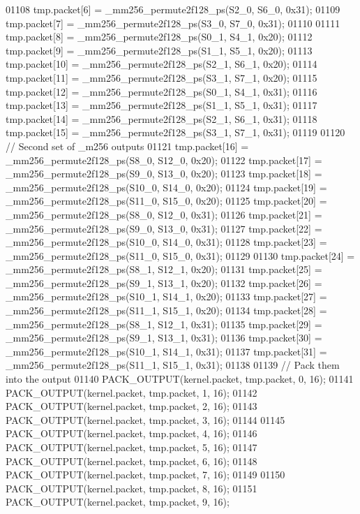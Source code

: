 \begin{DoxyCode}
01108   tmp.packet[6] = \_mm256\_permute2f128\_ps(S2\_0, S6\_0, 0x31);
01109   tmp.packet[7] = \_mm256\_permute2f128\_ps(S3\_0, S7\_0, 0x31);
01110 
01111   tmp.packet[8] = \_mm256\_permute2f128\_ps(S0\_1, S4\_1, 0x20);
01112   tmp.packet[9] = \_mm256\_permute2f128\_ps(S1\_1, S5\_1, 0x20);
01113   tmp.packet[10] = \_mm256\_permute2f128\_ps(S2\_1, S6\_1, 0x20);
01114   tmp.packet[11] = \_mm256\_permute2f128\_ps(S3\_1, S7\_1, 0x20);
01115   tmp.packet[12] = \_mm256\_permute2f128\_ps(S0\_1, S4\_1, 0x31);
01116   tmp.packet[13] = \_mm256\_permute2f128\_ps(S1\_1, S5\_1, 0x31);
01117   tmp.packet[14] = \_mm256\_permute2f128\_ps(S2\_1, S6\_1, 0x31);
01118   tmp.packet[15] = \_mm256\_permute2f128\_ps(S3\_1, S7\_1, 0x31);
01119 
01120   \textcolor{comment}{// Second set of \_m256 outputs}
01121   tmp.packet[16] = \_mm256\_permute2f128\_ps(S8\_0, S12\_0, 0x20);
01122   tmp.packet[17] = \_mm256\_permute2f128\_ps(S9\_0, S13\_0, 0x20);
01123   tmp.packet[18] = \_mm256\_permute2f128\_ps(S10\_0, S14\_0, 0x20);
01124   tmp.packet[19] = \_mm256\_permute2f128\_ps(S11\_0, S15\_0, 0x20);
01125   tmp.packet[20] = \_mm256\_permute2f128\_ps(S8\_0, S12\_0, 0x31);
01126   tmp.packet[21] = \_mm256\_permute2f128\_ps(S9\_0, S13\_0, 0x31);
01127   tmp.packet[22] = \_mm256\_permute2f128\_ps(S10\_0, S14\_0, 0x31);
01128   tmp.packet[23] = \_mm256\_permute2f128\_ps(S11\_0, S15\_0, 0x31);
01129 
01130   tmp.packet[24] = \_mm256\_permute2f128\_ps(S8\_1, S12\_1, 0x20);
01131   tmp.packet[25] = \_mm256\_permute2f128\_ps(S9\_1, S13\_1, 0x20);
01132   tmp.packet[26] = \_mm256\_permute2f128\_ps(S10\_1, S14\_1, 0x20);
01133   tmp.packet[27] = \_mm256\_permute2f128\_ps(S11\_1, S15\_1, 0x20);
01134   tmp.packet[28] = \_mm256\_permute2f128\_ps(S8\_1, S12\_1, 0x31);
01135   tmp.packet[29] = \_mm256\_permute2f128\_ps(S9\_1, S13\_1, 0x31);
01136   tmp.packet[30] = \_mm256\_permute2f128\_ps(S10\_1, S14\_1, 0x31);
01137   tmp.packet[31] = \_mm256\_permute2f128\_ps(S11\_1, S15\_1, 0x31);
01138 
01139   \textcolor{comment}{// Pack them into the output}
01140   PACK\_OUTPUT(kernel.packet, tmp.packet, 0, 16);
01141   PACK\_OUTPUT(kernel.packet, tmp.packet, 1, 16);
01142   PACK\_OUTPUT(kernel.packet, tmp.packet, 2, 16);
01143   PACK\_OUTPUT(kernel.packet, tmp.packet, 3, 16);
01144 
01145   PACK\_OUTPUT(kernel.packet, tmp.packet, 4, 16);
01146   PACK\_OUTPUT(kernel.packet, tmp.packet, 5, 16);
01147   PACK\_OUTPUT(kernel.packet, tmp.packet, 6, 16);
01148   PACK\_OUTPUT(kernel.packet, tmp.packet, 7, 16);
01149 
01150   PACK\_OUTPUT(kernel.packet, tmp.packet, 8, 16);
01151   PACK\_OUTPUT(kernel.packet, tmp.packet, 9, 16);

\end{DoxyCode}
